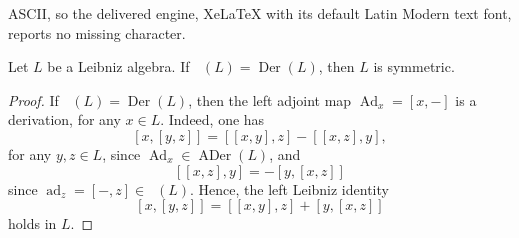 \documentclass[10pt,a4paper]{amsart}
\DeclareMathOperator{\ADer}{ADer}
\DeclareMathOperator{\Ad}{Ad}
\DeclareMathOperator{\DerL}{Der_{Lie}}
\DeclareMathOperator{\Der}{Der}
\DeclareMathOperator{\ad}{ad}
\begin{document}
ASCII, so the delivered engine, XeLaTeX with its default Latin Modern text font, reports no missing character.
\begin{proposition}\label{prop_sym}
Let $L$ be a Leibniz algebra. If $\DerL(L)=\Der(L)$, then $L$ is symmetric.
\end{proposition}

\begin{proof}
If $\DerL(L)=\Der(L)$, then the left adjoint map $\Ad_x=[x,-]$ is a derivation, for any $x \in L$. Indeed, one has
\[
[x,[y,z]]=[[x,y],z]-[[x,z],y],
\]
for any $y,z \in L$, since $\Ad_x \in \ADer(L)$, and
\[
[[x,z],y]=-[y,[x,z]]
\]
since $\ad_z=[-,z] \in \DerL(L)$. Hence, the left Leibniz identity
\[
[x,[y,z]]=[[x,y],z]+[y,[x,z]]
\]
holds in $L$.
\end{proof}
\end{document}
